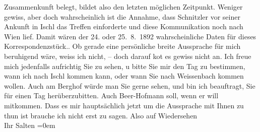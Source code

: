 \begin{ledgroupsized}[t]{13cm}
{{{                  Zusammenkunft belegt, bildet also den letzten möglichen Zeitpunkt. Weniger gewiss,
                  aber doch wahrscheinlich ist die Annahme, dass Schnitzler vor seiner Ankunft in Ischl das Treffen einforderte und diese Kommunikation noch nach Wien lief. Damit wären der 24. oder
                     25. 8. 1892 wahrscheinliche Daten für dieses
                  Korrespondenzstück.}}}\label{K_L03114-1h}. Ob gerade eine persönliche breite Aussprache für mich
               beruhigend wäre, weiss ich nicht, – doch darauf ko{\geminationm}t es
               gewiss nicht an. Ich freue mich jedenfalls aufrichtig Sie zu sehen, u bitte Sie mir
               den Tag zu bestimmen, wann ich nach Ischl kommen
               kann, oder wann Sie nach Weissenbach kommen
               wollen. Auch {\pb}am Berghof würde man Sie gerne sehen, und bin ich beauftragt, Sie für
               einen Tag herüberzubitten. Auch Beer-Hofmann soll, wenn
               er will mitkommen. Dass es mir hauptsächlich jetzt um die Aussprache mit Ihnen zu
               thun ist brauche ich nicht erst zu sagen.\pend
           \pstart
           Also auf Wiedersehen {\\[\baselineskip]}Ihr \spacefill\mbox{Salten}\pend
           \leftskip=0em{}
         
         \endnumbering{}\end{ledgroupsized}\begin{anhang}\end{anhang}\newcommand{\dateiname}{L03114}\newcommand{\titel}{Felix Salten an Arthur Schnitzler, [24. oder 25.? 8. 1892]}\newcommand{\editorInnen}{Martin Anton Müller und Laura Untner}
      